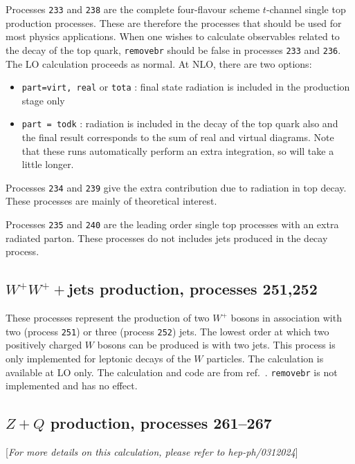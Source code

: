 \documentclass{article}
\begin{document}
{{{{{{Processes {\tt 233} and {\tt 238} are the complete four-flavour scheme $t$-channel single top production processes.
These are therefore the processes that should be used for most physics applications.
When one wishes to calculate observables related to the decay of the top
quark, {\tt removebr} should be false in processes {\tt 233} and {\tt 236}.
The LO calculation proceeds as normal. At NLO, there are two options:
\begin{itemize}
\item {\tt part=virt, real} or {\tt tota} : final state radiation is included
in the production stage only
\item {\tt part = todk} : radiation is included in the decay of the top
quark also and the final result corresponds to the sum of real and virtual
diagrams. 
Note that these runs automatically perform an extra integration, so
will take a little longer.
\end{itemize}


Processes {\tt 234} and {\tt 239} give the extra contribution due to radiation 
in top decay. These processes are mainly of theoretical interest. 

Processes {\tt 235} and {\tt 240} are the leading order single top processes with an 
extra radiated parton. These processes do not includes jets produced in the decay process.

\subsection{$W^+W^++$jets production, processes 251,252}
These processes represent the production of two $W^+$ 
bosons in association with two (process {\tt 251}) or three (process {\tt 252})
jets.  The lowest order at which two positively charged $W$ bosons 
can be produced is with two jets. 
This process is only implemented for leptonic decays of the 
$W$ particles. The calculation is available at LO only.
The calculation and code are from ref.~\cite{Melia:2010bm}.
{\tt removebr} is not implemented and has no effect.

\subsection{$Z+Q$ production, processes 261--267}
\label{subsec:ZQ}

\begin{center}
[{\it For more details on this calculation, please refer to hep-ph/0312024}]
\end{center}

}}}}}}
\end{document}
